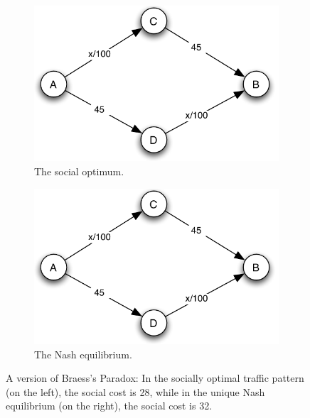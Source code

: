 \documentclass[10pt]{beamer}
\begin{document}
\begin{frame}
\begin{figure}[h]
    \centering
    \begin{subfigure}{0.45\textwidth}
        \centering
        \includegraphics[width=\textwidth,page=4]{fig/note02/braess.pdf}
        \caption{The social optimum.}
        \label{fig:social_optimum}
    \end{subfigure}
    \hfill %
    \begin{subfigure}{0.45\textwidth}
        \centering
        \includegraphics[width=\textwidth,page=5]{fig/note02/braess.pdf}
        \caption{The Nash equilibrium.}
        \label{fig:nash_equilibrium}
    \end{subfigure}
    \caption{A version of Braess's Paradox: In the socially optimal traffic pattern (on the left), the social cost is 28, while in the unique Nash equilibrium (on the right), the social cost is 32.}
    \label{fig:braess_paradox}
\end{figure}
\end{frame}
\end{document}
